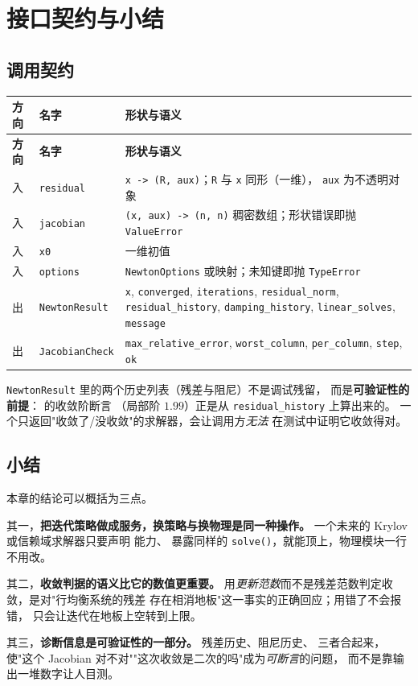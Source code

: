 \section{接口契约与小结}
\label{sec:newton-interface}

\subsection{调用契约}

{\small
\begin{longtable}{@{}p{} p{} p{}@{}}
\toprule
\textbf{方向} & \textbf{名字} & \textbf{形状与语义}\\
\midrule
\endfirsthead
\toprule
\textbf{方向} & \textbf{名字} & \textbf{形状与语义}\\
\midrule
\endhead
\bottomrule
\endfoot
入 & \texttt{residual} & \texttt{x -> (R, aux)}；\texttt{R} 与 \texttt{x} 同形（一维），
  \texttt{aux} 为不透明对象\\
入 & \texttt{jacobian} & \texttt{(x, aux) -> (n, n)} 稠密数组；形状错误即抛 \texttt{ValueError}\\
入 & \texttt{x0} & 一维初值\\
入 & \texttt{options} & \texttt{NewtonOptions} 或映射；未知键即抛 \texttt{TypeError}\\
出 & \texttt{NewtonResult} & \texttt{x}, \texttt{converged}, \texttt{iterations},
  \texttt{residual\_norm}, \texttt{residual\_history}, \texttt{damping\_history},
  \texttt{linear\_solves}, \texttt{message}\\
出 & \texttt{JacobianCheck} & \texttt{max\_relative\_error}, \texttt{worst\_column},
  \texttt{per\_column}, \texttt{step}, \texttt{ok}\\
\end{longtable}
}

\noindent
\texttt{NewtonResult} 里的两个历史列表（残差与阻尼）不是调试残留，
而是\textbf{可验证性的前提}： 的收敛阶断言
（局部阶 $1.99$）正是从 \texttt{residual\_history} 上算出来的。
一个只返回"收敛了/没收敛"的求解器，会让调用方\emph{无法}
在测试中证明它收敛得对。

\subsection*{小结}

本章的结论可以概括为三点。

其一，\textbf{把迭代策略做成服务，换策略与换物理是同一种操作。}
一个未来的 Krylov 或信赖域求解器只要声明  能力、
暴露同样的 \texttt{solve()}，就能顶上，物理模块一行不用改。

其二，\textbf{收敛判据的语义比它的数值更重要。}
用\emph{更新范数}而不是残差范数判定收敛，是对"行均衡系统的残差
存在相消地板"这一事实的正确回应；用错了不会报错，
只会让迭代在地板上空转到上限。

其三，\textbf{诊断信息是可验证性的一部分。}
残差历史、阻尼历史、 三者合起来，
使"这个 Jacobian 对不对""这次收敛是二次的吗"成为\emph{可断言}的问题，
而不是靠输出一堆数字让人目测。

\cleardoublepage
